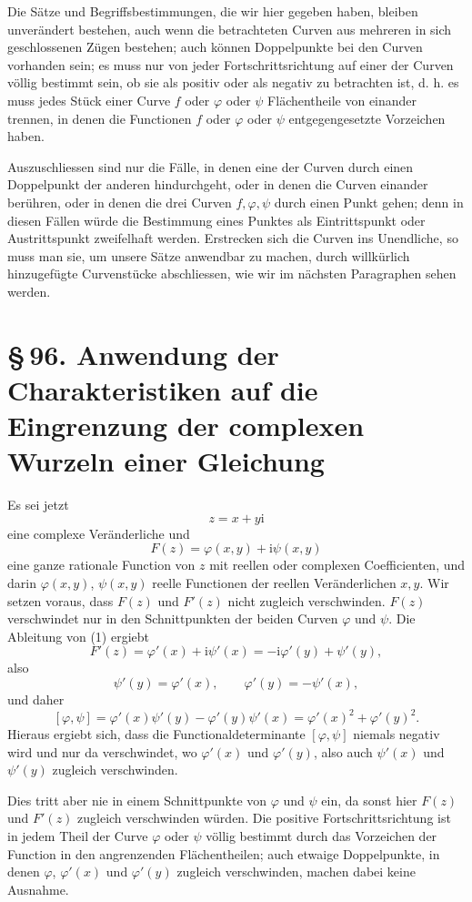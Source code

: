 \documentclass[11pt]{article}
\providecommand{\ii}{\mathrm{i}}
\providecommand{\sect}[2]{\section*{\S\,#1. #2}}
\begin{document}
Die Sätze und Begriffsbestimmungen, die wir hier gegeben haben, bleiben unverändert bestehen, auch wenn die betrachteten Curven aus mehreren in sich geschlossenen Zügen bestehen; auch können Doppelpunkte bei den Curven vorhanden sein; es muss nur von jeder Fortschrittsrichtung auf einer der Curven völlig bestimmt sein, ob sie als positiv oder als negativ zu betrachten ist, d. h. es muss jedes Stück einer Curve $f$ oder $\varphi$ oder $\psi$ Flächentheile von einander trennen, in denen die Functionen $f$ oder $\varphi$ oder $\psi$ entgegengesetzte Vorzeichen haben.

Auszuschliessen sind nur die Fälle, in denen eine der Curven durch einen Doppelpunkt der anderen hindurchgeht, oder in denen die Curven einander berühren, oder in denen die drei Curven $f,\varphi,\psi$ durch einen Punkt gehen; denn in diesen Fällen würde die Bestimmung eines Punktes als Eintrittspunkt oder Austrittspunkt zweifelhaft werden. Erstrecken sich die Curven ins Unendliche, so muss man sie, um unsere Sätze anwendbar zu machen, durch willkürlich hinzugefügte Curvenstücke abschliessen, wie wir im nächsten Paragraphen sehen werden.

\sect{96}{Anwendung der Charakteristiken auf die Eingrenzung der complexen Wurzeln einer Gleichung}

Es sei jetzt
\[
        z=x+y\ii
\]
eine complexe Veränderliche und
\begin{equation}
        F(z)=\varphi(x,y)+\ii\psi(x,y)
\tag{1}
\end{equation}
eine ganze rationale Function von $z$ mit reellen oder complexen Coefficienten, und darin $\varphi(x,y)$, $\psi(x,y)$ reelle Functionen der reellen Veränderlichen $x,y$. Wir setzen voraus, dass $F(z)$ und $F'(z)$ nicht zugleich verschwinden. $F(z)$ verschwindet nur in den Schnittpunkten der beiden Curven $\varphi$ und $\psi$. Die Ableitung von (1) ergiebt
\[
        F'(z)=\varphi'(x)+\ii\psi'(x)=-\ii\varphi'(y)+\psi'(y),
\]
also
\[
        \psi'(y)=\varphi'(x),\qquad \varphi'(y)=-\psi'(x),
\]
und daher
\[
        [\varphi,\psi]=\varphi'(x)\psi'(y)-\varphi'(y)\psi'(x)
        =\varphi'(x)^2+\varphi'(y)^2.
\]
Hieraus ergiebt sich, dass die Functionaldeterminante $[\varphi,\psi]$ niemals negativ wird und nur da verschwindet, wo $\varphi'(x)$ und $\varphi'(y)$, also auch $\psi'(x)$ und $\psi'(y)$ zugleich verschwinden.

Dies tritt aber nie in einem Schnittpunkte von $\varphi$ und $\psi$ ein, da sonst hier $F(z)$ und $F'(z)$ zugleich verschwinden würden. Die positive Fortschrittsrichtung ist in jedem Theil der Curve $\varphi$ oder $\psi$ völlig bestimmt durch das Vorzeichen der Function in den angrenzenden Flächentheilen; auch etwaige Doppelpunkte, in denen $\varphi$, $\varphi'(x)$ und $\varphi'(y)$ zugleich verschwinden, machen dabei keine Ausnahme.
\end{document}
